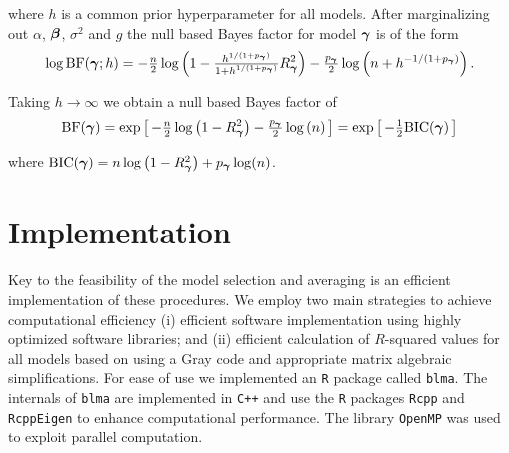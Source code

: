 \noindent where $h$ is a common prior hyperparameter for all models. After marginalizing
out $\alpha$, ${\boldsymbol \beta}$, $\sigma^2$ and $g$ the null based Bayes factor 
for model ${\boldsymbol \gamma}$ is of the form
$$
\begin{array}{rl}
\displaystyle \log\mbox{BF}({\boldsymbol \gamma};h)
=
-\tfrac{n}{2}\log\left( 1 - \tfrac{h^{1/(1+p_{\boldsymbol \gamma})}}{1+h^{1/(1+p_{\boldsymbol \gamma})}} R_{\boldsymbol \gamma}^2 \right) 
- \tfrac{p_{\boldsymbol \gamma}}{2}\log\left(n + h^{-1/(1+p_{\boldsymbol \gamma})} \right).
\end{array}
$$

\noindent Taking $h\to\infty$ we obtain a null based Bayes factor of
\begin{equation}\label{eq:marginalLikelihoodCake}
	\displaystyle \mbox{BF}({\boldsymbol \gamma})
	=
	\exp\left[ \,
	-\tfrac{n}{2}\log\left( 1 - R_{\boldsymbol \gamma}^2 \right) 
	- \tfrac{p_{\boldsymbol \gamma}}{2}\log\left(n \right) \,
	\right] = \exp\left[ \, -\tfrac{1}{2}\mbox{BIC}({\boldsymbol \gamma}) \,\right]
\end{equation}

\noindent where $\mbox{BIC}({\boldsymbol \gamma}) = n\log\left( 1 - R_{\boldsymbol \gamma}^2 \right) + p_{\boldsymbol \gamma} \log(n)$. 



\section{Implementation}
\label{sec:implementation}

\noindent
Key to the feasibility of the model selection and averaging is an efficient implementation of these procedures. We employ two main 
strategies to achieve computational efficiency (i) efficient software implementation using
highly optimized software libraries; and (ii) efficient calculation of
$R$-squared values for all models based on using a Gray code and appropriate
matrix algebraic simplifications.
For ease of use we 
implemented an {\tt R} package called {\tt blma}.
The internals of {\tt blma} are implemented
in {\tt C++} and use the {\tt R} packages \texttt{Rcpp} and \texttt{RcppEigen} to enhance
computational performance. The library {\tt OpenMP} was used to
exploit parallel computation.

